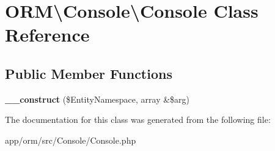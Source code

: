 \hypertarget{classORM_1_1Console_1_1Console}{}\section{O\+RM\textbackslash{}Console\textbackslash{}Console Class Reference}
\label{classORM_1_1Console_1_1Console}
\subsection*{Public Member Functions}
\begin{DoxyCompactItemize}
\item 
{\bfseries \+\_\+\+\_\+construct} (\$Entity\+Namespace, array \&\$arg)\hypertarget{classORM_1_1Console_1_1Console_aefac843251e8d9896a7438ea33a8546c}{}\label{classORM_1_1Console_1_1Console_aefac843251e8d9896a7438ea33a8546c}

\end{DoxyCompactItemize}


The documentation for this class was generated from the following file\+:\begin{DoxyCompactItemize}
\item 
app/orm/src/\+Console/Console.\+php\end{DoxyCompactItemize}
